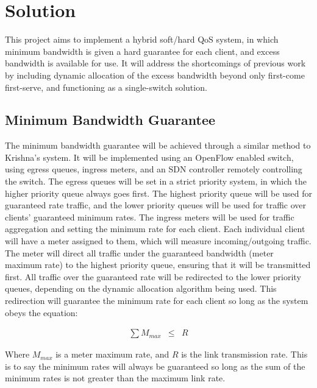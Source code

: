 \documentclass[accepted,single]{gipaper}
\begin{document}
\section{Solution}
\label{solution}

This project aims to implement a hybrid soft/hard QoS system, in which minimum bandwidth is given a hard guarantee for each client, and excess bandwidth is available for use. It will address the shortcomings of previous work by including dynamic allocation of the excess bandwidth beyond only first-come first-serve, and functioning as a single-switch solution.

\subsection{Minimum Bandwidth Guarantee}
\label{sol_min_band}

The minimum bandwidth guarantee will be achieved through a similar method to Krishna’s \cite{Krishna:2016} system. It will be implemented using an OpenFlow enabled switch, using egress queues, ingress meters, and an SDN controller remotely controlling the switch. The egress queues will be set in a strict priority system, in which the higher priority queue always goes first. The highest priority queue will be used for guaranteed rate traffic, and the lower priority queues will be used for traffic over clients’ guaranteed minimum rates. The ingress meters will be used for traffic aggregation and setting the minimum rate for each client. Each individual client will have a meter assigned to them, which will measure incoming/outgoing traffic. The meter will direct all traffic under the guaranteed bandwidth (meter maximum rate) to the highest priority queue, ensuring that it will be transmitted first. All traffic over the guaranteed rate will be redirected to the lower priority queues, depending on the dynamic allocation algorithm being used. This redirection will guarantee the minimum rate for each client so long as the system obeys the equation:

\begin{eqnarray*}
	\sum M_{max} &\leq& R
\end{eqnarray*}

Where $M_{max}$ is a meter maximum rate, and $R$ is the link transmission rate. This is to say the minimum rates will always be guaranteed so long as the sum of the minimum rates is not greater than the maximum link rate.
\end{document}

